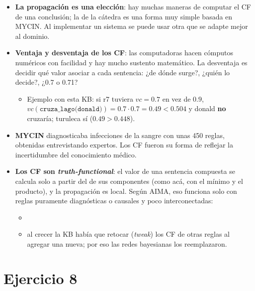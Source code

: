 \documentclass[11pt,a4paper]{article}
\begin{document}
\begin{extras}
\begin{itemize}
  \item \textbf{La propagación es una elección}: hay muchas maneras de computar el CF de una conclusión; la de la cátedra es una forma muy simple basada en MYCIN. Al implementar un sistema se puede usar otra que se adapte mejor al dominio.
  \item \textbf{Ventaja y desventaja de los CF}: las computadoras hacen cómputos numéricos con facilidad y hay mucho sustento matemático. La desventaja es decidir qué valor asociar a cada sentencia: ¿de dónde surge?, ¿quién lo decide?, ¿0.7 o 0.71?
  \begin{itemize}
    \item Ejemplo con esta KB: si r7 tuviera $vc = 0.7$ en vez de $0.9$, $vc(\texttt{cruza\_lago(donald)}) = 0.7 \cdot 0.7 = 0.49 < 0.504$ y donald \textbf{no} cruzaría; turuleca sí ($0.49 > 0.448$).
  \end{itemize}
  \item \textbf{MYCIN} diagnosticaba infecciones de la sangre con unas 450 reglas, obtenidas entrevistando expertos. Los CF fueron su forma de reflejar la incertidumbre del conocimiento médico.
  \item \textbf{Los CF son \textit{truth-functional}}: el valor de una sentencia compuesta se calcula solo a partir del de sus componentes (como acá, con el mínimo y el producto), y la propagación es local. Según AIMA, eso funciona solo con reglas puramente diagnósticas o causales y poco interconectadas:
  \begin{itemize}
    \item {}
    \item al crecer la KB había que retocar (\textit{tweak}) los CF de otras reglas al agregar una nueva; por eso las redes bayesianas los reemplazaron.
  \end{itemize}
\end{itemize}
\end{extras}

\section{Ejercicio 8}
\end{document}
